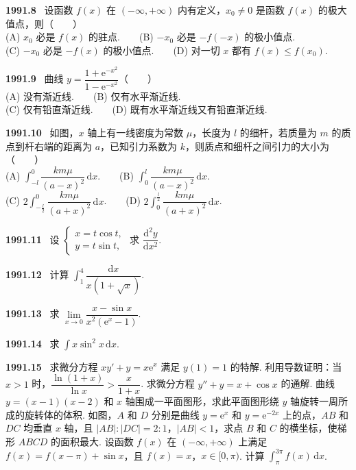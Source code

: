 \documentclass[UTF8,12pt]{ctexart}
\newcommand{\qn}[1]{\textbf{\large #1}\ }
\begin{document}
\vfill
\newpage
\qn{1991.8}
设函数 $f(x)$ 在 $(-\infty,+\infty)$ 内有定义，$x_0\neq 0$ 是函数 $f(x)$ 的极大值点，则（　　）
\\
\noindent (A) $x_0$ 必是 $f(x)$ 的驻点.　　(B) $-x_0$ 必是 $-f(-x)$ 的极小值点.
\\
\noindent (C) $-x_0$ 必是 $-f(x)$ 的极小值点.　　(D) 对一切 $x$ 都有 $f(x)\leqslant f(x_0)$.

\vfill
\newpage
\qn{1991.9}
曲线 $y=\dfrac{1+\mathrm{e}^{-x^2}}{1-\mathrm{e}^{-x^2}}$（　　）
\\
\noindent (A) 没有渐近线.　　(B) 仅有水平渐近线.
\\
\noindent (C) 仅有铅直渐近线.　　(D) 既有水平渐近线又有铅直渐近线.

\vfill
\newpage
\qn{1991.10}
如图，$x$ 轴上有一线密度为常数 $\mu$，长度为 $l$ 的细杆，若质量为 $m$ 的质点到杆右端的距离为 $a$，已知引力系数为 $k$，则质点和细杆之间引力的大小为（　　）
\\
\noindent (A) $\int_{-l}^0\dfrac{km\mu}{(a-x)^2}\,\mathrm{d}x$.　　(B) $\int_0^l\dfrac{km\mu}{(a-x)^2}\,\mathrm{d}x$.
\\
\noindent (C) $2\int_{-\frac{l}{2}}^0\dfrac{km\mu}{(a+x)^2}\,\mathrm{d}x$.　　(D) $2\int_0^{\frac{l}{2}}\dfrac{km\mu}{(a+x)^2}\,\mathrm{d}x$.

\vfill
\newpage
\qn{1991.11}
设 $\begin{cases} x=t\cos t, \\ y=t\sin t, \end{cases}$ 求 $\dfrac{\mathrm{d}^2y}{\mathrm{d}x^2}$.

\vfill
\newpage
\qn{1991.12}
计算 $\int_1^4\dfrac{\mathrm{d}x}{x(1+\sqrt{x})}$.

\vfill
\newpage
\qn{1991.13}
求 $\lim\limits_{x\to0}\dfrac{x-\sin x}{x^2(\mathrm{e}^x-1)}$.

\vfill
\newpage
\qn{1991.14}
求 $\int x\sin^2 x\,\mathrm{d}x$.

\vfill
\newpage
\qn{1991.15}
求微分方程 $xy'+y=x\mathrm{e}^x$ 满足 $y(1)=1$ 的特解.
利用导数证明：当 $x>1$ 时，$\dfrac{\ln(1+x)}{\ln x}>\dfrac{x}{1+x}$.
求微分方程 $y''+y=x+\cos x$ 的通解.
曲线 $y=(x-1)(x-2)$ 和 $x$ 轴围成一平面图形，求此平面图形绕 $y$ 轴旋转一周所成的旋转体的体积.
如图，$A$ 和 $D$ 分别是曲线 $y=\mathrm{e}^x$ 和 $y=\mathrm{e}^{-2x}$ 上的点，$AB$ 和 $DC$ 均垂直 $x$ 轴，且 $|AB|:|DC|=2:1$，$|AB|<1$，求点 $B$ 和 $C$ 的横坐标，使梯形 $ABCD$ 的面积最大.
设函数 $f(x)$ 在 $(-\infty,+\infty)$ 上满足 $f(x)=f(x-\pi)+\sin x$，且 $f(x)=x$，$x\in[0,\pi)$. 计算 $\int_\pi^{3\pi}f(x)\,\mathrm{d}x$.

\vfill
\newpage
\end{document}
